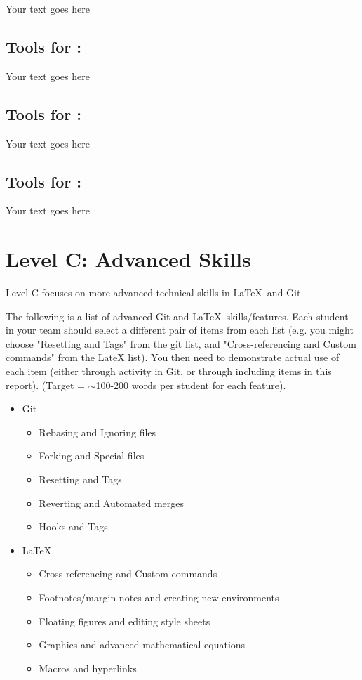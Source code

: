 \documentclass[a4paper, 11pt]{report}
\begin{document}
Your text goes here

\subsection{Tools for \majB: \studB}

Your text goes here

\subsection{Tools for \majC: \studC}

Your text goes here

\subsection{Tools for \majD: \studD}

Your text goes here



\newpage
\section{Level C: Advanced Skills}

Level C focuses on more advanced technical skills in \LaTeX\ and Git.

The following is a list of advanced Git and \LaTeX\ skills/features. Each student in your team should select a different pair of items from each list (e.g. you might choose "Resetting and Tags" from the git list, and "Cross-referencing and Custom commands" from the LateX list). You then need to demonstrate actual use of each item (either through activity in Git, or through including items in this report). (Target = $\sim$100-200 words per student for each feature).
\begin{itemize}
	\item Git
	\begin{itemize}
		\item Rebasing and Ignoring files
		\item Forking and Special files
		\item Resetting and Tags
		\item Reverting and Automated merges
		\item Hooks and Tags
	\end{itemize}
	\item \LaTeX\ 
	\begin{itemize}
		\item Cross-referencing and Custom commands
		\item Footnotes/margin notes and creating new environments
		\item Floating figures and editing style sheets
		\item Graphics and advanced mathematical equations
		\item Macros and hyperlinks
	\end{itemize}
\end{itemize}
\end{document}
